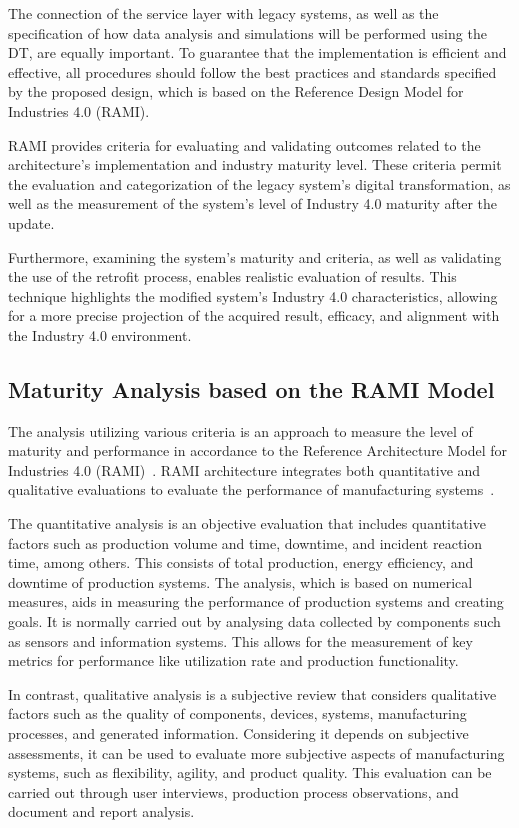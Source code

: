 \documentclass[journal]{IEEEtran}
\begin{document}
The connection of the service layer with legacy systems, as well as the specification of how data analysis and simulations will be performed using the DT, are equally important. To guarantee that the implementation is efficient and effective, all procedures should follow the best practices and standards specified by the proposed design, which is based on the Reference Design Model for Industries 4.0 (RAMI).

RAMI provides criteria for evaluating and validating outcomes related to the architecture's implementation and industry maturity level. These criteria permit the evaluation and categorization of the legacy system's digital transformation, as well as the measurement of the system's level of Industry 4.0 maturity after the update.

Furthermore, examining the system's maturity and criteria, as well as validating the use of the retrofit process, enables realistic evaluation of results. This technique highlights the modified system's Industry 4.0 characteristics, allowing for a more precise projection of the acquired result, efficacy, and alignment with the Industry 4.0 environment.

\subsection{Maturity Analysis based on the RAMI Model}

The analysis utilizing various criteria is an approach to measure the level of maturity and performance in accordance to the Reference Architecture Model for Industries 4.0 (RAMI)~\cite{ramos2020}. RAMI architecture integrates both quantitative and qualitative evaluations to evaluate the performance of manufacturing systems~\cite{hasbullah2023}.

The quantitative analysis is an objective evaluation that includes quantitative factors such as production volume and time, downtime, and incident reaction time, among others. This consists of total production, energy efficiency, and downtime of production systems. The analysis, which is based on numerical measures, aids in measuring the performance of production systems and creating goals. It is normally carried out by analysing data collected by components such as sensors and information systems. This allows for the measurement of key metrics for performance like utilization rate and production functionality.

In contrast, qualitative analysis is a subjective review that considers qualitative factors such as the quality of components, devices, systems, manufacturing processes, and generated information. Considering it depends on subjective assessments, it can be used to evaluate more subjective aspects of manufacturing systems, such as flexibility, agility, and product quality. This evaluation can be carried out through user interviews, production process observations, and document and report analysis.
\end{document}
